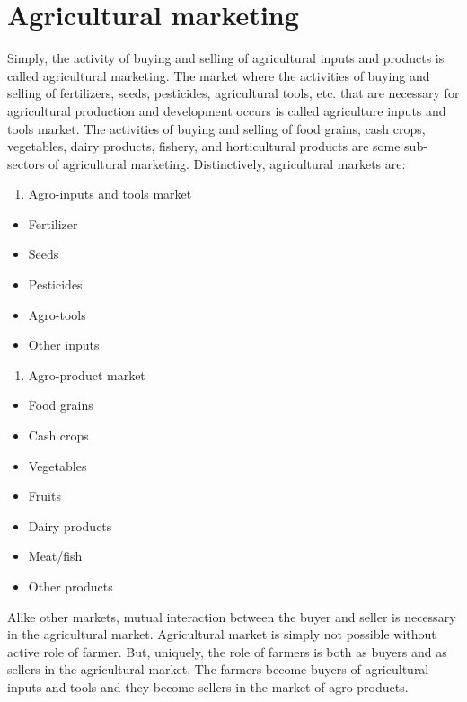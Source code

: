 \documentclass[11pt,]{book}
\providecommand{\tightlist}{%
  \setlength{\itemsep}{0pt}\setlength{\parskip}{0pt}}
\theoremstyle{definition}
\theoremstyle{definition}
\theoremstyle{definition}
\theoremstyle{remark}
\begin{document}
\section{Agricultural marketing}\label{agricultural-marketing-1}

Simply, the activity of buying and selling of agricultural inputs and
products is called agricultural marketing. The market where the
activities of buying and selling of fertilizers, seeds, pesticides,
agricultural tools, etc. that are necessary for agricultural production
and development occurs is called agriculture inputs and tools market.
The activities of buying and selling of food grains, cash crops,
vegetables, dairy products, fishery, and horticultural products are some
sub-sectors of agricultural marketing. Distinctively, agricultural
markets are:

\begin{enumerate}
\def\labelenumi{\arabic{enumi}.}
\tightlist
\item
  Agro-inputs and tools market
\end{enumerate}

\begin{itemize}
\tightlist
\item
  Fertilizer
\item
  Seeds
\item
  Pesticides
\item
  Agro-tools
\item
  Other inputs
\end{itemize}

\begin{enumerate}
\def\labelenumi{\arabic{enumi}.}
\setcounter{enumi}{1}
\tightlist
\item
  Agro-product market
\end{enumerate}

\begin{itemize}
\tightlist
\item
  Food grains
\item
  Cash crops
\item
  Vegetables
\item
  Fruits
\item
  Dairy products
\item
  Meat/fish
\item
  Other products
\end{itemize}

Alike other markets, mutual interaction between the buyer and seller is
necessary in the agricultural market. Agricultural market is simply not
possible without active role of farmer. But, uniquely, the role of
farmers is both as buyers and as sellers in the agricultural market. The
farmers become buyers of agricultural inputs and tools and they become
sellers in the market of agro-products.
\end{document}
